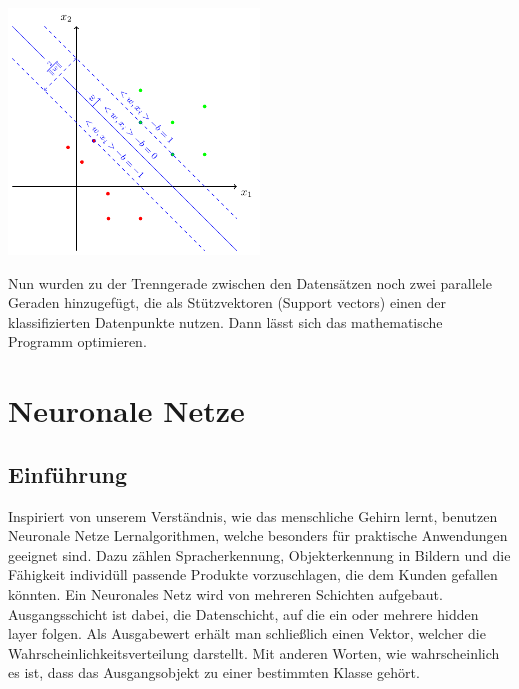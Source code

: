 \begin{dsafigure}
	\begin{center}
		\includegraphics[width=0.5\textwidth]{Figure_SVM}
		\caption{Nun wurden zu der Trenngerade zwischen den Datensätzen noch zwei parallele Geraden hinzugefügt, die als Stützvektoren (Support vectors) einen der klassifizierten Datenpunkte nutzen. Dann lässt sich das mathematische Programm optimieren.}
		\label{FigSVM}
	\end{center}
\end{dsafigure}

\section{Neuronale Netze}


\subsection{Einführung}

Inspiriert von unserem Verständnis, wie das menschliche Gehirn lernt, benutzen Neuronale Netze Lernalgorithmen, welche besonders für praktische Anwendungen geeignet sind.
Dazu zählen Spracherkennung, Objekterkennung in Bildern und die Fähigkeit individüll passende Produkte vorzuschlagen, die dem Kunden gefallen könnten. 
Ein Neuronales Netz wird von mehreren Schichten aufgebaut. Ausgangsschicht ist dabei, die Datenschicht, auf die ein oder mehrere hidden layer folgen. Als Ausgabewert erhält man schließlich einen Vektor, welcher die Wahrscheinlichkeitsverteilung darstellt. Mit anderen Worten, wie wahrscheinlich es ist, dass das Ausgangsobjekt zu einer bestimmten Klasse gehört.

